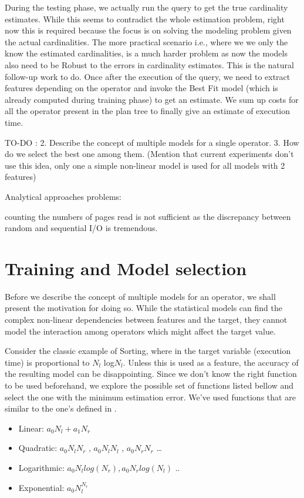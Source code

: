 \documentclass{article}
\begin{document}
\begin{multicols}{2}
\hfill
	
	During the testing phase, we actually run the query to get the true cardinality estimates. While this
	seems to contradict the whole estimation problem, right now this is required because the focus is on
	solving the modeling problem given the actual cardinalities. The more practical scenario i.e., where
	we we only the know the estimated cardinalities, is a much harder problem as now the models also need 
	to be Robust to the errors in cardinality estimates. This is the natural follow-up work to do. Once 
	after the execution of the query, we need to extract features depending on the operator and invoke 
	the Best Fit model (which is already computed during training phase) to get an estimate. We sum up 
	costs for all the operator present in the plan tree to finally give an estimate of execution time. 	
	
	
TO-DO :  
2. Describe the concept of multiple models for a single operator.
3. How do we select the best one among them. (Mention that current experiments don't use this idea, only one a simple non-linear model is used for all models with 2 features) 


Analytical approaches problems: 

counting the numbers of pages read is not sufficient as the discrepancy between random and sequential I/O is tremendous.

	\section{Training and Model selection}
	Before we describe the concept of multiple models for an operator, we shall present the motivation 
	for doing so. While the statistical models can find the complex non-linear dependencies between 			features and the target, they cannot model the interaction among operators which might
	affect the target value. 
     
	Consider the classic example of Sorting, where in the target variable (execution time) is 
	proportional to $N_{l}$ log$N_{l}$. Unless this is used as a feature, the accuracy of the resulting 
	model can be disappointing. Since we don't know the right function to be used beforehand, 
	we explore the possible set of functions listed bellow and select the one with the 
	minimum estimation error. We've used functions that are similar to the one's defined in 					\cite{robustIISc}.
	
	\begin{itemize}
	\item Linear: $a_{0} N_{l} + a_{1} N_{r}$ 
	\item Quadratic: $a_{0} N_{l}N_{r}$ , $a_{0} N_{l}N_{l}$ , $a_{0} N_{r}N_{r}$ \ldots
	\item Logarithmic: $a_{0} N_{l} log(N_{r}) , a_{0} N_{r} log(N_{l}) $ .. 
	\item Exponential: $a_{0} N_{l} ^ {N_{r}}$  	
	\end{itemize}	
	

\end{multicols}
\end{document}
